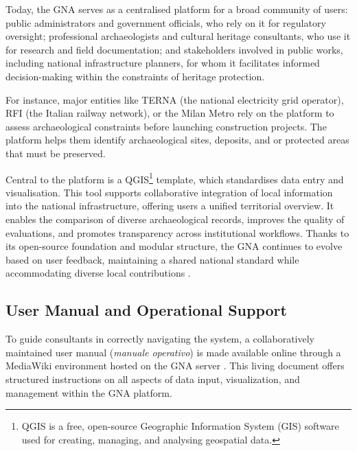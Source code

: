 \begin{spacing}{1.5}
Today, the GNA serves as a centralised platform for a broad community of users: public administrators and government officials, who rely on it for regulatory oversight; professional archaeologists and cultural heritage consultants, who use it for research and field documentation; and stakeholders involved in public works, including national infrastructure planners, for whom it facilitates informed decision-making within the constraints of heritage protection.

For instance, major entities like TERNA (the national electricity grid operator), RFI (the Italian railway network), or the Milan Metro rely on the platform to assess archaeological constraints before launching construction projects. The platform helps them identify archaeological sites, deposits, and or protected areas that must be preserved.

Central to the platform is a QGIS\footnote{QGIS is a free, open-source Geographic Information System (GIS) software used for creating, managing, and analysing geospatial data.} template, which standardises data entry and visualisation. This tool supports collaborative integration of local information into the national infrastructure, offering users a unified territorial overview. It enables the comparison of diverse archaeological records, improves the quality of evaluations, and promotes transparency across institutional workflows. Thanks to its open-source foundation and modular structure, the GNA continues to evolve based on user feedback, maintaining a shared national standard while accommodating diverse local contributions \citep{calandra_il_2023, boi_il_2023}.

\subsection{User Manual and Operational Support}
To guide consultants in correctly navigating the system, a collaboratively maintained user manual (\textit{manuale operativo}) is made available online through a MediaWiki environment hosted on the GNA server \citep{gna_wiki_2024}. This living document offers structured instructions on all aspects of data input, visualization, and management within the GNA platform.


\end{spacing}
